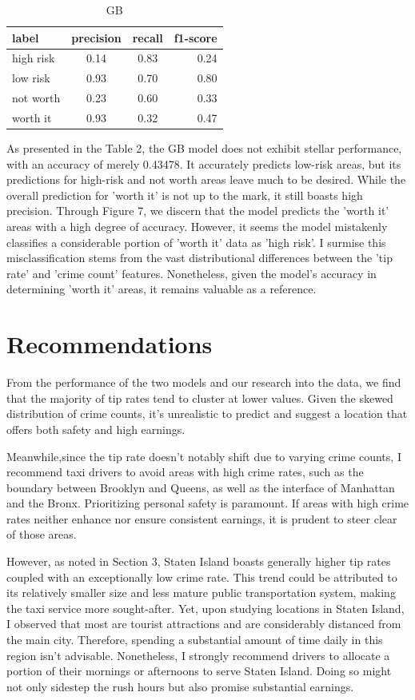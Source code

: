 \documentclass[11pt]{article}
\begin{document}
\begin{table}[h]
\centering
\caption{GB}
\label{table:example}
\begin{tabular}{|l|c|c|r|}
\hline
label & precision & recall & f1-score\\
\hline
high risk & 0.14 & 0.83 & 0.24\\
low risk & 0.93 & 0.70 & 0.80\\
not worth & 0.23 & 0.60 & 0.33\\
worth it & 0.93 & 0.32 & 0.47\\
\hline
\end{tabular}
\end{table}

As presented in the Table 2, the GB model does not exhibit stellar performance, with an accuracy of merely 0.43478. It accurately predicts low-risk areas, but its predictions for high-risk and not worth areas leave much to be desired. While the overall prediction for 'worth it' is not up to the mark, it still boasts high precision. Through Figure 7, we discern that the model predicts the 'worth it' areas with a high degree of accuracy. However, it seems the model mistakenly classifies a considerable portion of 'worth it' data as 'high risk'. I surmise this misclassification stems from the vast distributional differences between the 'tip rate' and 'crime count' features. Nonetheless, given the model's accuracy in determining 'worth it' areas, it remains valuable as a reference.
\section{Recommendations}
From the performance of the two models and our research into the data, we find that the majority of tip rates tend to cluster at lower values. Given the skewed distribution of crime counts, it's unrealistic to predict and suggest a location that offers both safety and high earnings.

Meanwhile,since the tip rate doesn't notably shift due to varying crime counts, I recommend taxi drivers to avoid areas with high crime rates, such as the boundary between Brooklyn and Queens, as well as the interface of Manhattan and the Bronx. Prioritizing personal safety is paramount. If areas with high crime rates neither enhance nor ensure consistent earnings, it is prudent to steer clear of those areas.

However, as noted in Section 3, Staten Island boasts generally higher tip rates coupled with an exceptionally low crime rate. This trend could be attributed to its relatively smaller size and less mature public transportation system, making the taxi service more sought-after. Yet, upon studying locations in Staten Island, I observed that most are tourist attractions and are considerably distanced from the main city. Therefore, spending a substantial amount of time daily in this region isn't advisable. Nonetheless, I strongly recommend drivers to allocate a portion of their mornings or afternoons to serve Staten Island. Doing so might not only sidestep the rush hours but also promise substantial earnings.
\end{document}

